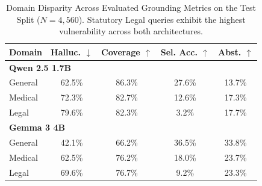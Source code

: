 \begin{table}[t]
\centering
\footnotesize
\setlength{\tabcolsep}{3.5pt}
\begin{tabular}{lcccc}
\toprule
\textbf{Domain} & \textbf{Halluc. $\downarrow$} & \textbf{Coverage $\uparrow$} & \textbf{Sel. Acc. $\uparrow$} & \textbf{Abst. $\uparrow$} \\
\midrule
\multicolumn{5}{l}{\textbf{Qwen 2.5 1.7B}} \\
\quad General & 62.5\% & 86.3\% & 27.6\% & 13.7\% \\
\quad Medical & 72.3\% & 82.7\% & 12.6\% & 17.3\% \\
\quad Legal   & 79.6\% & 82.3\% & \phantom{0}3.2\% & 17.7\% \\
\midrule
\multicolumn{5}{l}{\textbf{Gemma 3 4B}} \\
\quad General & 42.1\% & 66.2\% & 36.5\% & 33.8\% \\
\quad Medical & 62.5\% & 76.2\% & 18.0\% & 23.7\% \\
\quad Legal   & 69.6\% & 76.7\% & \phantom{0}9.2\% & 23.3\% \\
\bottomrule
\end{tabular}
\caption{Domain Disparity Across Evaluated Grounding Metrics on the Test Split ($N=4{,}560$). Statutory Legal queries exhibit the highest vulnerability across both architectures.}
\label{tab:domain_disparity}
\end{table}

